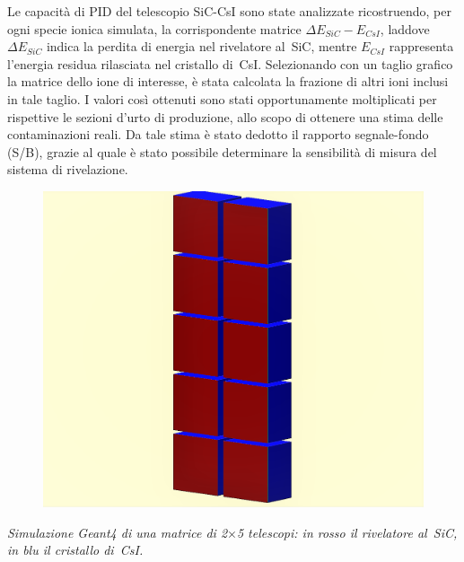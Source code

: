 \documentclass[10pt,foldmark,notumble]{leaflet}
\newcommand{\geant}{Geant4}
\begin{document}

Le capacità di PID del telescopio SiC-CsI sono state analizzate ricostruendo, per ogni specie ionica simulata, la corrispondente matrice $\Delta E_{SiC} - E_{CsI}$, laddove $\Delta E_{SiC}$ indica la perdita di energia nel rivelatore al~SiC, mentre $E_{CsI}$ rappresenta l'energia residua rilasciata nel cristallo di~CsI.
Selezionando con un taglio grafico la matrice dello ione di interesse, è stata calcolata la frazione di altri ioni inclusi in tale taglio.
I valori così ottenuti sono stati opportunamente moltiplicati per rispettive le sezioni d'urto di produzione, allo scopo di ottenere una stima delle contaminazioni reali.
Da tale stima è stato dedotto il rapporto segnale-fondo (S/B), grazie al quale è stato possibile determinare la sensibilità di misura del sistema di rivelazione.

\begin{figure} [!h]
	\centering
	\includegraphics[width=0.55\columnwidth, keepaspectratio]{Grafici/modulo2_ritagliato.png}
\end{figure}
\textit{Simulazione \geant{} di una matrice di 2$\times$5 telescopi: in rosso il rivelatore al~SiC, in blu il cristallo di~CsI.}
\end{document}
